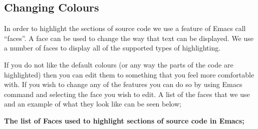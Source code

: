 \documentclass{report}
\begin{document}


\newpage


\subsection{Changing Colours}

In order to highlight the sections of source code we use a feature of
Emacs call ``faces''. A face can be used to change the way that text
can be displayed. We use a number of faces to display all of the
supported types of highlighting.

If you do not like the default colours (or any way the parts of the
code are highlighted) then you can edit them to something that you
feel more comfortable with. If you wish to change any of the features
you can do so by using Emacs  command and
selecting the face you wish to edit. A list of the faces that we use
and an example of what they look like can be seen below;

\medskip

\textbf{The list of Faces used to highlight sections of source code in
  Emacs;}
\end{document}
